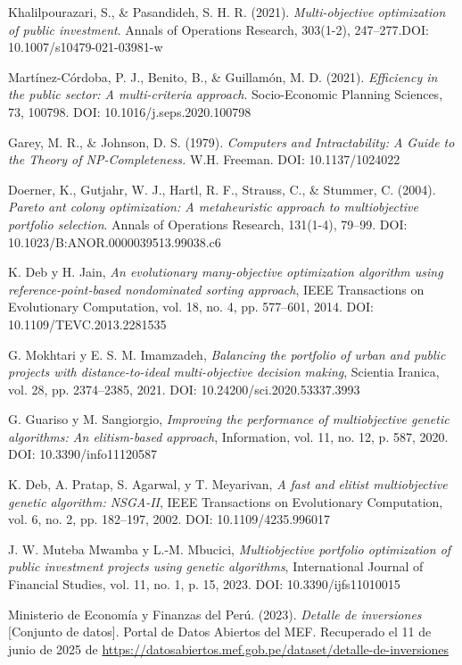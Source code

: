 \documentclass[12pt,a4paper]{article}
\begin{document}
\begin{thebibliography}{45}
Khalilpourazari, S., \& Pasandideh, S. H. R. (2021). \textit{Multi-objective optimization of public investment}. Annals of Operations Research, 303(1-2), 247–277.DOI: 10.1007/s10479-021-03981-w

Martínez-Córdoba, P. J., Benito, B., \& Guillamón, M. D. (2021). \textit{Efficiency in the public sector: A multi-criteria approach}. Socio-Economic Planning Sciences, 73, 100798.
DOI: 10.1016/j.seps.2020.100798

Garey, M. R., \& Johnson, D. S. (1979). \textit{Computers and Intractability: A Guide to the Theory of NP-Completeness.} W.H. Freeman.
DOI: 10.1137/1024022

Doerner, K., Gutjahr, W. J., Hartl, R. F., Strauss, C., \& Stummer, C. (2004). \textit{Pareto ant colony optimization: A metaheuristic approach to multiobjective portfolio selection}. Annals of Operations Research, 131(1-4), 79–99.
DOI: 10.1023/B:ANOR.0000039513.99038.c6


K. Deb y H. Jain, \textit{An evolutionary many-objective optimization algorithm using reference-point-based nondominated sorting approach}, IEEE Transactions on Evolutionary Computation, vol. 18, no. 4, pp. 577–601, 2014. DOI: 10.1109/TEVC.2013.2281535

G. Mokhtari y E. S. M. Imamzadeh, \textit{Balancing the portfolio of urban and public projects with distance-to-ideal multi-objective decision making}, Scientia Iranica, vol. 28, pp. 2374–2385, 2021. DOI: 10.24200/sci.2020.53337.3993

G. Guariso y M. Sangiorgio, \textit{Improving the performance of multiobjective genetic algorithms: An elitism-based approach}, Information, vol. 11, no. 12, p. 587, 2020. DOI: 10.3390/info11120587

K. Deb, A. Pratap, S. Agarwal, y T. Meyarivan, \textit{A fast and elitist multiobjective genetic algorithm: NSGA-II}, IEEE Transactions on Evolutionary Computation, vol. 6, no. 2, pp. 182–197, 2002. DOI: 10.1109/4235.996017

J. W. Muteba Mwamba y L.-M. Mbucici, \textit{Multiobjective portfolio optimization of public investment projects using genetic algorithms}, International Journal of Financial Studies, vol. 11, no. 1, p. 15, 2023. DOI: 10.3390/ijfs11010015

Ministerio de Economía y Finanzas del Perú. (2023). \textit{Detalle de inversiones} [Conjunto de datos]. Portal de Datos Abiertos del MEF. Recuperado el 11 de junio de 2025 de \url{https://datosabiertos.mef.gob.pe/dataset/detalle-de-inversiones}

\end{thebibliography}
\end{document}
